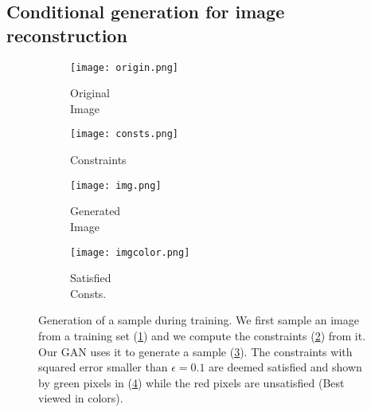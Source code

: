 


\subsection{Conditional generation for image reconstruction}
\label{subs:conditional_reconstruction}

\begin{figure}[t]
	\centering
	\begin{subfigure}[t]{0.25\textwidth}
		\centering
		\texttt{[image: origin.png]}
		\caption{Original\\Image}
		\label{fig:original_shoe}
	\end{subfigure}\begin{subfigure}[t]{0.25\textwidth}
		\centering
		\texttt{[image: consts.png]}
		\caption{Constraints}
		\label{fig:constraints}
	\end{subfigure}\begin{subfigure}[t]{0.25\textwidth}
		\centering
		\texttt{[image: img.png]}
		\caption{Generated\\Image}
		\label{fig:pixelwise}
	\end{subfigure}\begin{subfigure}[t]{0.24\textwidth}
		\centering
		\texttt{[image: imgcolor.png]}
		\caption{Satisfied\\Consts.}
		\label{fig:generated}
	\end{subfigure}
	\caption[Generation of a sample during training]{Generation of a sample during training. We first sample an image from a training set (\ref{fig:original_shoe}) and we compute the constraints (\ref{fig:constraints}) from it. Our GAN uses it to generate a sample (\ref{fig:pixelwise}). The constraints with squared error smaller than $\epsilon=0.1$ are deemed satisfied and shown by green pixels in (\ref{fig:generated}) while the red pixels are unsatisfied (Best viewed in colors).}
	\label{fig:image_completion}
\end{figure}

